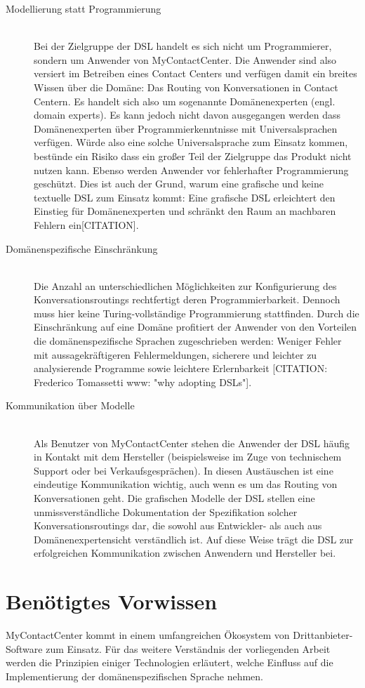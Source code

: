 \begin{description}
\item[Modellierung statt Programmierung] \hfill \\
Bei der Zielgruppe der DSL handelt es sich nicht um Programmierer, sondern um Anwender von MyContactCenter. Die Anwender sind also versiert im Betreiben eines Contact Centers und verfügen damit ein breites Wissen über die Domäne: Das Routing von Konversationen in Contact Centern. Es handelt sich also um sogenannte Domänenexperten (engl. domain experts). Es kann jedoch nicht davon ausgegangen werden dass Domänenexperten über Programmierkenntnisse mit Universalsprachen verfügen. Würde also eine solche Universalsprache zum Einsatz kommen, bestünde ein Risiko dass ein großer Teil der Zielgruppe das Produkt nicht nutzen kann. Ebenso werden Anwender vor fehlerhafter Programmierung geschützt. Dies ist auch der Grund, warum eine grafische und keine textuelle DSL zum Einsatz kommt: Eine grafische DSL erleichtert den Einstieg für Domänenexperten und schränkt den Raum an machbaren Fehlern ein[CITATION].
\item[Domänenspezifische Einschränkung] \hfill \\
Die Anzahl an unterschiedlichen Möglichkeiten zur Konfigurierung des Konversationsroutings rechtfertigt deren Programmierbarkeit. Dennoch muss hier keine Turing-vollständige Programmierung stattfinden. Durch die Einschränkung auf eine Domäne profitiert der Anwender von den Vorteilen die domänenspezifische Sprachen zugeschrieben werden: Weniger Fehler mit aussagekräftigeren Fehlermeldungen, sicherere und leichter zu analysierende Programme sowie leichtere Erlernbarkeit [CITATION: Frederico Tomassetti www: "why adopting DSLs"].
\item[Kommunikation über Modelle] \hfill \\
Als Benutzer von MyContactCenter stehen die Anwender der DSL häufig in Kontakt mit dem Hersteller (beispielsweise im Zuge von technischem Support oder bei Verkaufsgesprächen). In diesen Austäuschen ist eine eindeutige Kommunikation wichtig, auch wenn es um das Routing von Konversationen geht. Die grafischen Modelle der DSL stellen eine unmissverständliche Dokumentation der Spezifikation solcher Konversationsroutings dar, die sowohl aus Entwickler- als auch aus Domänenexpertensicht verständlich ist. Auf diese Weise trägt die DSL zur erfolgreichen Kommunikation zwischen Anwendern und Hersteller bei.
\end{description}


\section{Benötigtes Vorwissen}
MyContactCenter kommt in einem umfangreichen Ökosystem von Drittanbieter-Software zum Einsatz. Für das weitere Verständnis der vorliegenden Arbeit werden die Prinzipien einiger Technologien erläutert, welche Einfluss auf die Implementierung der domänenspezifischen Sprache nehmen. 

